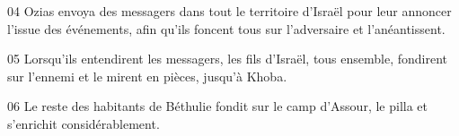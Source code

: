 
04 Ozias envoya des messagers dans tout le territoire d'Israël pour leur annoncer l'issue des événements, afin qu'ils foncent tous sur l'adversaire et l'anéantissent.

05 Lorsqu'ils entendirent les messagers, les fils d'Israël, tous ensemble, fondirent sur l'ennemi et le mirent en pièces, jusqu'à Khoba.

06 Le reste des habitants de Béthulie fondit sur le camp d'Assour, le pilla et s'enrichit considérablement.